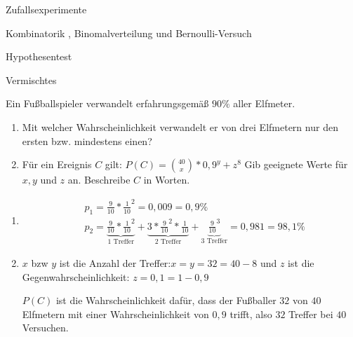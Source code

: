 


\begin{inhalt}
	\item Zufallsexperimente 
	\item Kombinatorik , Binomalverteilung und Bernoulli-Versuch 
	\item Hypothesentest 
	\item Vermischtes
\end{inhalt}

Ein Fußballspieler verwandelt erfahrungsgemäß $90\%$ aller Elfmeter.
\begin{enumerate}
	\item Mit welcher Wahrscheinlichkeit verwandelt er von drei Elfmetern nur den ersten bzw. mindestens einen?
	\item Für ein Ereignis $C$ gilt: $P(C)=\binom{40}{x}*0,9^y+z^8$ Gib geeignete Werte für $x,y$ und $z$ an. Beschreibe $C$ in Worten.
\end{enumerate}
\begin{lsg}{}
	\begin{enumerate}
		\item \begin{align*}
			&p_1=\frac 9{10}*\frac1{10}^2=0,009=0,9\%\\
			&p_2=\underbrace{\frac 9 {10}*\frac 1{10}^2}_{\text{1 Treffer}}
						+\underbrace{3* \frac 9 {10}^2*\frac 1{10}}_{\text{2 Treffer}}
						+\underbrace{\frac 9 {10}^3}_{\text{3 Treffer}} = 0,981=98,1\%
					\end{align*}
		\item $x$ bzw $y$ ist die Anzahl der Treffer:$x=y=32=40-8$ und $z$ ist die Gegenwahrscheinlichkeit: $z=0,1=1-0,9$

		$P(C)$ ist die Wahrscheinlichkeit dafür, dass der Fußballer $32$ von $40$ Elfmetern mit einer Wahrscheinlichkeit von $0,9$ trifft, also $32$ Treffer bei $40$ Versuchen.
	\end{enumerate}
\end{lsg}


